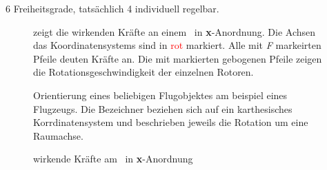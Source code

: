 6 Freiheitsgrade, tatsächlich 4 individuell regelbar.




\begin{figure}[ht!]
\vspace{0.25cm}
\begin{center}
\caption{wirkende Kräfte am \Quad\ in \textbf{x}-Anordnung }
\label{fig:Forces}
\end{center}

\vspace{0.25cm}
 zeigt die wirkenden Kräfte an einem \Quad\ in \textbf{x}-Anordnung. Die Achsen das Koordinatensystems sind in \textcolor{red}{rot} markiert. Alle mit \textit{F} markeirten Pfeile deuten Kräfte an. Die mit \missing[Omega] markierten gebogenen Pfeile zeigen die Rotationsgeschwindigkeit der einzelnen Rotoren.



 Orientierung eines beliebigen Flugobjektes am beispiel eines Flugzeugs. Die Bezeichner beziehen sich auf ein karthesisches Korrdinatensystem und beschrieben jeweils die Rotation um eine Raumachse.
\end{figure}







